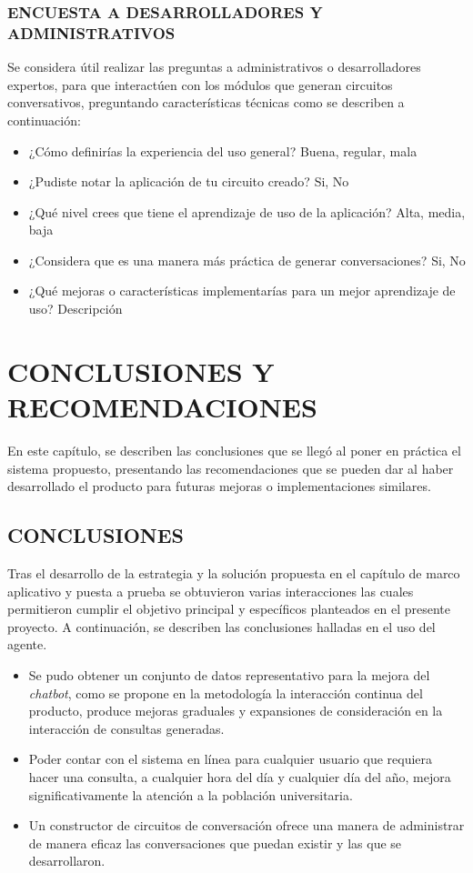 \documentclass[letter, openright, 12pt]{book}
\begin{document}
{\subsection{ENCUESTA A DESARROLLADORES Y ADMINISTRATIVOS}
Se considera útil realizar las preguntas a administrativos o desarrolladores expertos, para que interactúen con los módulos que generan circuitos conversativos, preguntando características técnicas como se describen a continuación:

\begin{itemize}
\item ¿Cómo definirías la experiencia del uso general? Buena, regular, mala
\item ¿Pudiste notar la aplicación de tu circuito creado? Si, No
\item ¿Qué nivel crees que tiene el aprendizaje de uso de la aplicación? Alta, media, baja
\item ¿Considera que es una manera más práctica de generar conversaciones? Si, No
\item ¿Qué mejoras o características implementarías para un mejor aprendizaje de uso? Descripción
\end{itemize}


\chapter{CONCLUSIONES Y RECOMENDACIONES}
En este capítulo, se describen las conclusiones que se llegó al poner en práctica el sistema propuesto, presentando las recomendaciones que se pueden dar al haber desarrollado el producto para futuras mejoras o implementaciones similares.

\section{CONCLUSIONES}
Tras el desarrollo de la estrategia y la solución propuesta en el capítulo de marco aplicativo y puesta a prueba se obtuvieron varias interacciones las cuales permitieron cumplir el objetivo principal y específicos planteados en el presente proyecto. A continuación, se describen las conclusiones halladas en el uso del agente.
\begin{itemize}
\item Se pudo obtener un conjunto de datos representativo para la mejora del \textit{chatbot}, como se propone en la metodología la interacción continua del producto, produce mejoras graduales y expansiones de consideración en la interacción de consultas generadas.
\item Poder contar con el sistema en línea para cualquier usuario que requiera hacer una consulta, a cualquier hora del día y cualquier día del año, mejora significativamente la atención a la población universitaria.
\item Un constructor de circuitos de conversación ofrece una manera de administrar de manera eficaz las conversaciones que puedan existir y las que se desarrollaron. 
\end{itemize}

}
\end{document}
